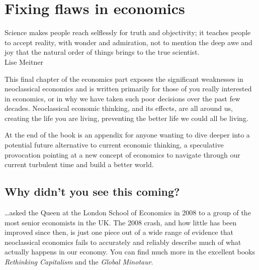 ﻿\chapter{Fixing flaws in economics}
\label{chapter:gen-th-economies-flaws}


\begin{chapterquotation}
Science makes people reach selflessly for truth and objectivity; it teaches people to accept reality, with wonder and admiration, not to mention the deep awe and joy that the natural order of things brings to the true scientist. \\
\raggedleft\textemdash Lise Meitner 
\end{chapterquotation}


This final chapter of the economics part exposes the significant weaknesses in neoclassical economics and is written primarily for those of you really interested in economics, or in why we have taken such poor decisions over the past few decades. Neoclassical economic thinking, and its effects, are all around us, creating the life you are living, preventing the better life we could all be living.


At the end of the book  is an appendix for anyone wanting to dive deeper into a potential future alternative to current economic thinking, a speculative provocation pointing at a new concept of economics to navigate through our current turbulent time and build a better world.  




\section{Why didn't you see this coming?}
\ldots asked the Queen at the London School of Economics in 2008 to a group of the most senior economists in the UK. The 2008 crash, and how little has been improved since then\cite{guardian-groundhog-day}, is just one piece out of a wide range of evidence that neoclassical economics fails to accurately and reliably describe much of what actually happens in our economy. You can find much more in the excellent books \emph{Rethinking Capitalism}\cite{mazzucato-rethinking-capitalism} and the \emph{Global Minotaur}\cite{varoufakis-minotaur}. 


